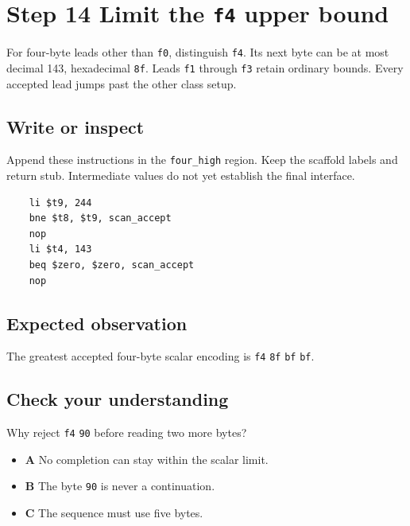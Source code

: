 \section{Step 14 Limit the \texttt{f4} upper bound}\label{utf8-s14}

For four-byte leads other than \texttt{f0}, distinguish \texttt{f4}. Its next byte can be at most decimal 143, hexadecimal \texttt{8f}. Leads \texttt{f1} through \texttt{f3} retain ordinary bounds. Every accepted lead jumps past the other class setup.

\subsection{Write or inspect}
Append these instructions in the \texttt{four\_high} region. Keep the scaffold labels and return stub. Intermediate values do not yet establish the final interface.

\begin{verbatim}
    li $t9, 244
    bne $t8, $t9, scan_accept
    nop
    li $t4, 143
    beq $zero, $zero, scan_accept
    nop
\end{verbatim}

\subsection{Expected observation}
The greatest accepted four-byte scalar encoding is \texttt{f4} \texttt{8f} \texttt{bf} \texttt{bf}.

\subsection{Check your understanding}
Why reject \texttt{f4} \texttt{90} before reading two more bytes?

\begin{itemize}
  \item \textbf{A} No completion can stay within the scalar limit.
  \item \textbf{B} The byte \texttt{90} is never a continuation.
  \item \textbf{C} The sequence must use five bytes.
\end{itemize}
